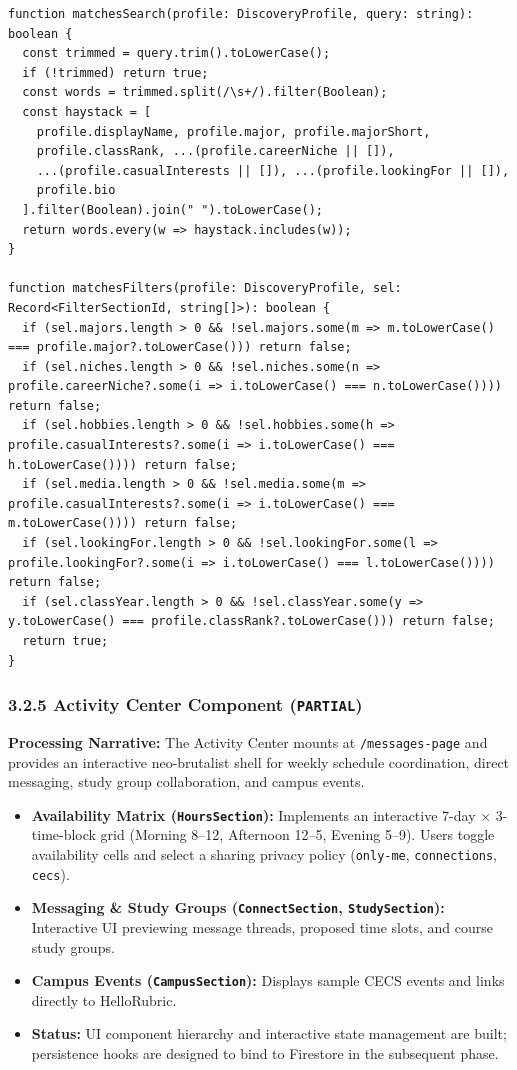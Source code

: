 \documentclass[11pt,letterpaper]{article}
\begin{document}
\begin{lstlisting}[caption={In-Memory Filter Matching Algorithm}]
function matchesSearch(profile: DiscoveryProfile, query: string): boolean {
  const trimmed = query.trim().toLowerCase();
  if (!trimmed) return true;
  const words = trimmed.split(/\s+/).filter(Boolean);
  const haystack = [
    profile.displayName, profile.major, profile.majorShort,
    profile.classRank, ...(profile.careerNiche || []),
    ...(profile.casualInterests || []), ...(profile.lookingFor || []),
    profile.bio
  ].filter(Boolean).join(" ").toLowerCase();
  return words.every(w => haystack.includes(w));
}

function matchesFilters(profile: DiscoveryProfile, sel: Record<FilterSectionId, string[]>): boolean {
  if (sel.majors.length > 0 && !sel.majors.some(m => m.toLowerCase() === profile.major?.toLowerCase())) return false;
  if (sel.niches.length > 0 && !sel.niches.some(n => profile.careerNiche?.some(i => i.toLowerCase() === n.toLowerCase()))) return false;
  if (sel.hobbies.length > 0 && !sel.hobbies.some(h => profile.casualInterests?.some(i => i.toLowerCase() === h.toLowerCase()))) return false;
  if (sel.media.length > 0 && !sel.media.some(m => profile.casualInterests?.some(i => i.toLowerCase() === m.toLowerCase()))) return false;
  if (sel.lookingFor.length > 0 && !sel.lookingFor.some(l => profile.lookingFor?.some(i => i.toLowerCase() === l.toLowerCase()))) return false;
  if (sel.classYear.length > 0 && !sel.classYear.some(y => y.toLowerCase() === profile.classRank?.toLowerCase())) return false;
  return true;
}
\end{lstlisting}

\subsubsection*{3.2.5 Activity Center Component (\texttt{PARTIAL})}
\textbf{Processing Narrative:} The Activity Center mounts at \texttt{/messages-page} and provides an interactive neo-brutalist shell for weekly schedule coordination, direct messaging, study group collaboration, and campus events.
\begin{itemize}[leftmargin=*,noitemsep]
\item \textbf{Availability Matrix (\texttt{HoursSection}):} Implements an interactive 7-day $\times$ 3-time-block grid (Morning 8--12, Afternoon 12--5, Evening 5--9). Users toggle availability cells and select a sharing privacy policy (\texttt{only-me}, \texttt{connections}, \texttt{cecs}).
\item \textbf{Messaging \& Study Groups (\texttt{ConnectSection}, \texttt{StudySection}):} Interactive UI previewing message threads, proposed time slots, and course study groups.
\item \textbf{Campus Events (\texttt{CampusSection}):} Displays sample CECS events and links directly to HelloRubric.
\item \textbf{Status:} UI component hierarchy and interactive state management are built; persistence hooks are designed to bind to Firestore in the subsequent phase.
\end{itemize}
\end{document}
